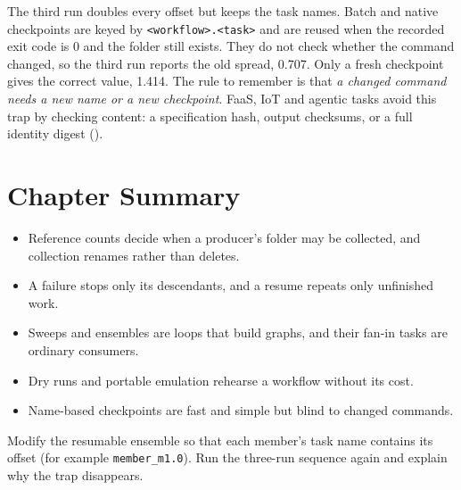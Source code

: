 \begin{cautionbox}
The third run doubles every offset but keeps the task names. Batch and native
checkpoints are keyed by \texttt{<workflow>.<task>} and are reused when the
recorded exit code is 0 and the folder still exists. They do not check whether
the command changed, so the third run reports the old spread, 0.707. Only a
fresh checkpoint gives the correct value, 1.414. The rule to remember is that
\emph{a changed command needs a new name or a new checkpoint}.
FaaS, IoT and agentic tasks avoid this trap by checking content: a
specification hash, output checksums, or a full identity digest
().
\end{cautionbox}

\section{Chapter Summary}

\begin{itemize}[leftmargin=1.4em]
  \item Reference counts decide when a producer's folder may be collected,
    and collection renames rather than deletes.
  \item A failure stops only its descendants, and a resume repeats only
    unfinished work.
  \item Sweeps and ensembles are loops that build graphs, and their fan-in
    tasks are ordinary consumers.
  \item Dry runs and portable emulation rehearse a workflow without its cost.
  \item Name-based checkpoints are fast and simple but blind to changed
    commands.
\end{itemize}

\begin{exercise}
Modify the resumable ensemble so that each member's task name contains its
offset (for example \texttt{member\_m1.0}). Run the three-run sequence again
and explain why the trap disappears.
\end{exercise}
